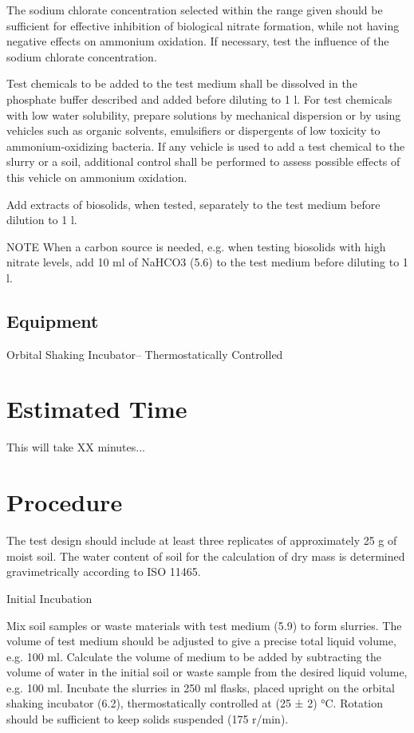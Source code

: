 \documentclass[12pt]{SOP5_beta}\usepackage[]{graphicx}\usepackage[]{xcolor}
\begin{document}
\NP The sodium chlorate concentration selected within the range given should be sufficient for effective inhibition of biological nitrate formation, while not having negative effects on ammonium oxidation. If necessary, test the influence of the sodium chlorate concentration. 

\NP Test chemicals to be added to the test medium shall be dissolved in the phosphate buffer described and added before diluting to 1 l. For test chemicals with low water solubility, prepare solutions by mechanical dispersion or by using vehicles such as organic solvents, emulsifiers or dispergents of low toxicity to ammonium-oxidizing bacteria. If any vehicle is used to add a test chemical to the slurry or a soil, additional control shall be performed to assess possible effects of this vehicle on ammonium oxidation. 

\NP Add extracts of biosolids, when tested, separately to the test medium before dilution to 1 l. 

\NP NOTE When a carbon source is needed, e.g. when testing biosolids with high nitrate levels, add 10 ml of  NaHCO3 (5.6) to the test medium before diluting to 1 l.

\subsection{Equipment}

\NP Orbital Shaking Incubator-- Thermostatically Controlled

\section{Estimated Time}

\NP This will take XX minutes...

\section{Procedure}

\NP The test design should include at least three replicates of approximately 25 g of moist soil. The water content of soil for the calculation of dry mass is determined gravimetrically according to ISO 11465.

Initial Incubation

\NP Mix soil samples or waste materials with test medium (5.9) to form slurries. The volume of test medium should be adjusted to give a precise total liquid volume, e.g. 100 ml. Calculate the volume of medium to be added by subtracting the volume of water in the initial soil or waste sample from the desired liquid volume, e.g. 100 ml. Incubate the slurries in 250 ml flasks, placed upright on the orbital shaking incubator (6.2), thermostatically controlled at (25 ± 2) °C. Rotation should be sufficient to keep solids suspended (175 r/min).
\end{document}
